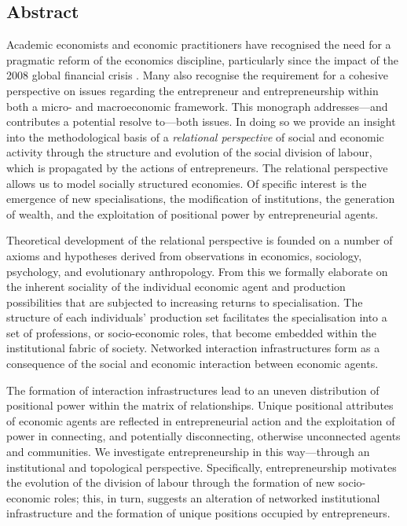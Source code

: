 \documentclass[11pt,fleqn]{book}
\begin{document}
\begin{singlespace}
\setcounter{tocdepth}{2}
\tableofcontents

\listoffigures

\chapter*{Abstract}


Academic economists and economic practitioners have recognised the need for a pragmatic reform of the economics discipline, particularly since the impact of the 2008 global financial crisis \citep{Hodgson2009}. Many also recognise the requirement for a cohesive perspective on issues regarding the entrepreneur and entrepreneurship within both a micro- and macroeconomic framework. This monograph addresses---and contributes a potential resolve to---both issues. In doing so we provide an insight into the methodological basis of a \emph{relational perspective} of social and economic activity through the structure and evolution of the social division of labour, which is propagated by the actions of entrepreneurs. The relational perspective allows us to model socially structured economies. Of specific interest is the emergence of new specialisations, the modification of institutions, the generation of wealth, and the exploitation of positional power by entrepreneurial agents.

Theoretical development of the relational perspective is founded on a number of axioms and hypotheses derived from observations in economics, sociology, psychology, and evolutionary anthropology. From this we formally elaborate on the inherent sociality of the individual economic agent and production possibilities that are subjected to increasing returns to specialisation. The structure of each individuals' production set facilitates the specialisation into a set of professions, or socio-economic roles, that become embedded within the institutional fabric of society. Networked interaction infrastructures form as a consequence of the social and economic interaction between economic agents.

The formation of interaction infrastructures lead to an uneven distribution of positional power within the matrix of relationships. Unique positional attributes of economic agents are reflected in entrepreneurial action and the exploitation of power in connecting, and potentially disconnecting, otherwise unconnected agents and communities. We investigate entrepreneurship in this way---through an institutional and topological perspective. Specifically, entrepreneurship motivates the evolution of the division of labour through the formation of new socio-economic roles; this, in turn, suggests an alteration of networked institutional infrastructure and the formation of unique positions occupied by entrepreneurs.


\end{singlespace}
\end{document}
